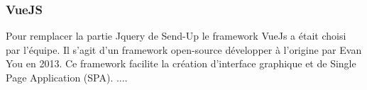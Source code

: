 \subsubsection{VueJS}
Pour remplacer la partie Jquery de Send-Up le framework VueJs a était choisi par l'équipe. Il s'agit d'un framework open-source développer à l'origine par Evan You en 2013. Ce framework facilite la création d'interface graphique et de Single Page Application (SPA). ....
